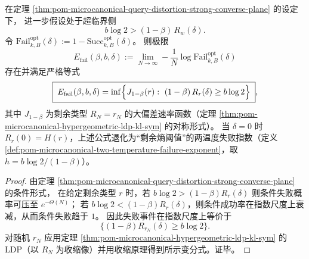 \begin{theorem}\label{thm:pom-microcanonical-query-distortion-failure-exponent}
在定理 \ref{thm:pom-microcanonical-query-distortion-strong-converse-plane} 的设定下，
进一步假设处于超临界侧
\[
b\log 2>(1-\beta)\,R_w(\delta).
\]
令 \(\mathrm{Fail}^{\mathrm{opt}}_{k,B}(\delta):=1-\mathrm{Succ}^{\mathrm{opt}}_{k,B}(\delta)\)。
则极限
\[
E_{\mathrm{fail}}(\beta,b,\delta)
:=\lim_{N\to\infty}-\frac{1}{N}\log \mathrm{Fail}^{\mathrm{opt}}_{k,B}(\delta)
\]
存在并满足严格等式
\[
\boxed{\;
E_{\mathrm{fail}}(\beta,b,\delta)
=\inf\Bigl\{J_{1-\beta}(r):\ (1-\beta)\,R_r(\delta)\ge b\log 2\Bigr\}\; } ,
\]
其中 \(J_{1-\beta}\) 为剩余类型 \(R_N=r_N\) 的大偏差速率函数（定理 \ref{thm:pom-microcanonical-hypergeometric-ldp-kl-sym} 的对称形式）。
当 \(\delta=0\) 时 \(R_r(0)=H(r)\)，上述公式退化为“剩余熵阈值”的两温度失败指数（定义 \ref{def:pom-microcanonical-two-temperature-failure-exponent}，取 \(h=b\log 2/(1-\beta)\)）。
\end{theorem}
\begin{proof}
由定理 \ref{thm:pom-microcanonical-query-distortion-strong-converse-plane} 的条件形式，
在给定剩余类型 \(r\) 时，若 \(b\log 2>(1-\beta)R_r(\delta)\) 则条件失败概率可压至 \(e^{-\Theta(N)}\)；
若 \(b\log 2<(1-\beta)R_r(\delta)\)，则条件成功率在指数尺度上衰减，从而条件失败趋于 \(1\)。
因此失败事件在指数尺度上等价于
\[
\{(1-\beta)R_{r_N}(\delta)\ge b\log 2\}.
\]
对随机 \(r_N\) 应用定理 \ref{thm:pom-microcanonical-hypergeometric-ldp-kl-sym} 的 LDP（以 \(R_N\) 为收缩像）并用收缩原理得到所示变分式。证毕。
\end{proof}

